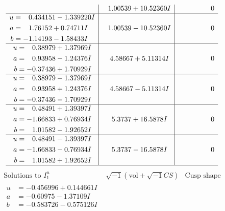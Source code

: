 \documentclass[1p]{elsarticle_modified}
\theoremstyle{definition}
\newcommand{\I}{\sqrt{-1}}
\begin{document}
$$\begin{array}{c|c|c}
 & \phantom{-}1.00539 + 10.52360 I & \phantom{-0.000000 } 0 \\ \hline\begin{aligned}
u &= \phantom{-}0.434151 - 1.339220 I \\
a &= \phantom{-}1.76152 + 0.74711 I \\
b &= -1.14193 - 1.58433 I\end{aligned}
 & \phantom{-}1.00539 - 10.52360 I & \phantom{-0.000000 } 0 \\ \hline\begin{aligned}
u &= \phantom{-}0.38979 + 1.37969 I \\
a &= \phantom{-}0.93958 - 1.24376 I \\
b &= -0.37436 + 1.70929 I\end{aligned}
 & \phantom{-}4.58667 + 5.11314 I & \phantom{-0.000000 } 0 \\ \hline\begin{aligned}
u &= \phantom{-}0.38979 - 1.37969 I \\
a &= \phantom{-}0.93958 + 1.24376 I \\
b &= -0.37436 - 1.70929 I\end{aligned}
 & \phantom{-}4.58667 - 5.11314 I & \phantom{-0.000000 } 0 \\ \hline\begin{aligned}
u &= \phantom{-}0.48491 + 1.39397 I \\
a &= -1.66833 + 0.76934 I \\
b &= \phantom{-}1.01582 - 1.92652 I\end{aligned}
 & \phantom{-}5.3737 + 16.5878 I & \phantom{-0.000000 } 0 \\ \hline\begin{aligned}
u &= \phantom{-}0.48491 - 1.39397 I \\
a &= -1.66833 - 0.76934 I \\
b &= \phantom{-}1.01582 + 1.92652 I\end{aligned}
 & \phantom{-}5.3737 - 16.5878 I & \phantom{-0.000000 } 0\\
 \hline 
 \end{array}$$\newpage$$\begin{array}{c|c|c}  
\text{Solutions to }I^u_{1}& \I (\text{vol} + \sqrt{-1}CS) & \text{Cusp shape}\\
 \hline 
\begin{aligned}
u &= -0.456996 + 0.144661 I \\
a &= -0.60975 - 1.37109 I \\
b &= -0.583726 - 0.575126 I\end{aligned}

\end{array}$$
\end{document}
